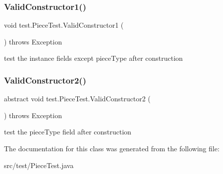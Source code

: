 \subsubsection{\texorpdfstring{Valid\+Constructor1()}{ValidConstructor1()}}
{\footnotesize\ttfamily void test.\+Piece\+Test.\+Valid\+Constructor1 (\begin{DoxyParamCaption}{ }\end{DoxyParamCaption}) throws Exception}

test the instance fields except piece\+Type after construction \mbox{\label{classtest_1_1_piece_test_a3c841ee578a23ea6162afd09e09434cd}} 
\subsubsection{\texorpdfstring{Valid\+Constructor2()}{ValidConstructor2()}}
{\footnotesize\ttfamily abstract void test.\+Piece\+Test.\+Valid\+Constructor2 (\begin{DoxyParamCaption}{ }\end{DoxyParamCaption}) throws Exception\hspace{0.3cm}{\ttfamily [abstract]}}

test the piece\+Type field after construction 

The documentation for this class was generated from the following file\+:\begin{DoxyCompactItemize}
\item 
src/test/Piece\+Test.\+java\end{DoxyCompactItemize}
